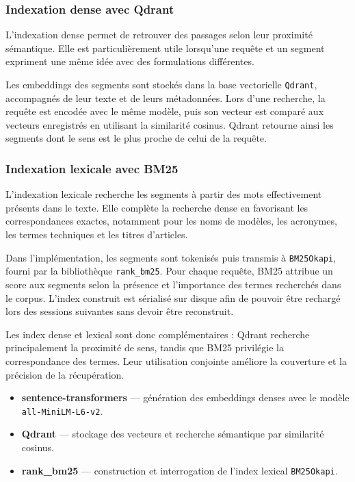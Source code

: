 \subsubsection{Indexation dense avec Qdrant}

L'indexation dense permet de retrouver des passages selon leur proximité sémantique.
Elle est particulièrement utile lorsqu'une requête et un segment expriment une même
idée avec des formulations différentes.

Les embeddings des segments sont stockés dans la base vectorielle \texttt{Qdrant},
accompagnés de leur texte et de leurs métadonnées. Lors d'une recherche, la requête
est encodée avec le même modèle, puis son vecteur est comparé aux vecteurs enregistrés
en utilisant la similarité cosinus. Qdrant retourne ainsi les segments dont le sens
est le plus proche de celui de la requête.

\subsubsection{Indexation lexicale avec BM25}

L'indexation lexicale recherche les segments à partir des mots effectivement présents
dans le texte. Elle complète la recherche dense en favorisant les correspondances
exactes, notamment pour les noms de modèles, les acronymes, les termes techniques et
les titres d'articles.

Dans l'implémentation, les segments sont tokenisés puis transmis à
\texttt{BM25Okapi}, fourni par la bibliothèque \texttt{rank\_bm25}. Pour chaque
requête, BM25 attribue un score aux segments selon la présence et l'importance des
termes recherchés dans le corpus. L'index construit est sérialisé sur disque afin de
pouvoir être rechargé lors des sessions suivantes sans devoir être reconstruit.

Les index dense et lexical sont donc complémentaires : Qdrant recherche principalement
la proximité de sens, tandis que BM25 privilégie la correspondance des termes. Leur
utilisation conjointe améliore la couverture et la précision de la récupération.

\begin{encadre}
\begin{itemize}
  \item \textbf{sentence-transformers} — génération des embeddings denses avec le
        modèle \texttt{all-MiniLM-L6-v2}.
  \item \textbf{Qdrant} — stockage des vecteurs et recherche sémantique par similarité
        cosinus.
  \item \textbf{rank\_bm25} — construction et interrogation de l'index lexical
        \texttt{BM25Okapi}.
\end{itemize}
\end{encadre}

